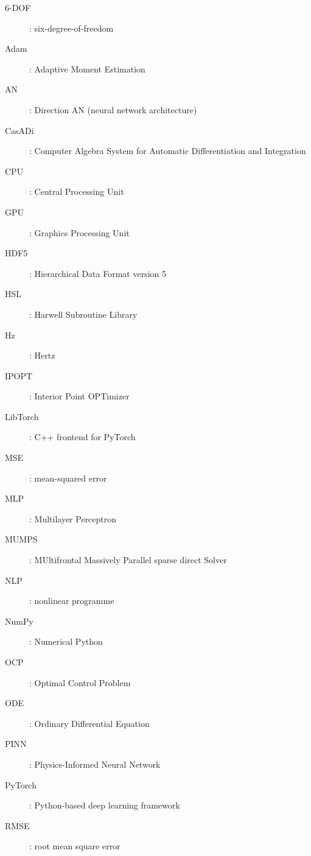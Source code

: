 \begin{description}
    \item[6-DOF]:  six-degree-of-freedom
    \item[Adam]:  Adaptive Moment Estimation
    \item[AN]:  Direction AN (neural network architecture)
    \item[CasADi]:  Computer Algebra System for Automatic Differentiation and Integration
    \item[CPU]:  Central Processing Unit
    \item[GPU]:  Graphics Processing Unit
    \item[HDF5]:  Hierarchical Data Format version 5
    \item[HSL]:  Harwell Subroutine Library
    \item[Hz]:  Hertz
    \item[IPOPT]:  Interior Point OPTimizer
    \item[LibTorch]:  C++ frontend for PyTorch
    \item[MSE]:  mean-squared error
    \item[MLP]:  Multilayer Perceptron
    \item[MUMPS]:  MUltifrontal Massively Parallel sparse direct Solver
    \item[NLP]:  nonlinear programme
    \item[NumPy]:  Numerical Python
    \item[OCP]:  Optimal Control Problem
    \item[ODE]:  Ordinary Differential Equation
    \item[PINN]:  Physics-Informed Neural Network
    \item[PyTorch]:  Python-based deep learning framework
    \item[RMSE]:  root mean square error
\end{description}